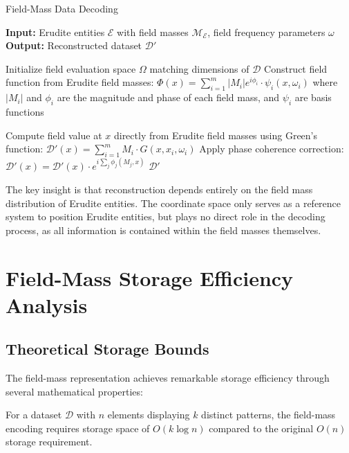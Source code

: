 \begin{algorithm}[h]
\caption{Field-Mass Data Decoding}
\begin{algorithmic}[1]
\State \textbf{Input:} Erudite entities $\mathcal{E}$ with field masses $\mathcal{M}_{\mathcal{E}}$, field frequency parameters $\omega$
\State \textbf{Output:} Reconstructed dataset $\mathcal{D'}$

\State Initialize field evaluation space $\Omega$ matching dimensions of $\mathcal{D}$
\State Construct field function from Erudite field masses:
\State \hspace{1em} $\Phi(x) = \sum_{i=1}^m |M_i| e^{i\phi_i} \cdot \psi_i(x, \omega_i)$
\State where $|M_i|$ and $\phi_i$ are the magnitude and phase of each field mass, and $\psi_i$ are basis functions

  \State Compute field value at $x$ directly from Erudite field masses using Green's function:
  \State \hspace{1em} $\mathcal{D'}(x) = \sum_{i=1}^m M_i \cdot G(x, x_i, \omega_i)$
  \State Apply phase coherence correction:
  \State \hspace{1em} $\mathcal{D'}(x) = \mathcal{D'}(x) \cdot e^{i\sum_j \phi_j(M_j,x)}$
\EndFor
\State \Return $\mathcal{D'}$
\end{algorithmic}
\end{algorithm}

The key insight is that reconstruction depends entirely on the field mass distribution of Erudite entities. The coordinate space only serves as a reference system to position Erudite entities, but plays no direct role in the decoding process, as all information is contained within the field masses themselves.

\section{Field-Mass Storage Efficiency Analysis}

\subsection{Theoretical Storage Bounds}

The field-mass representation achieves remarkable storage efficiency through several mathematical properties:

\begin{theorem}
For a dataset $\mathcal{D}$ with $n$ elements displaying $k$ distinct patterns, the field-mass encoding requires storage space of $O(k \log n)$ compared to the original $O(n)$ storage requirement.
\end{theorem}

